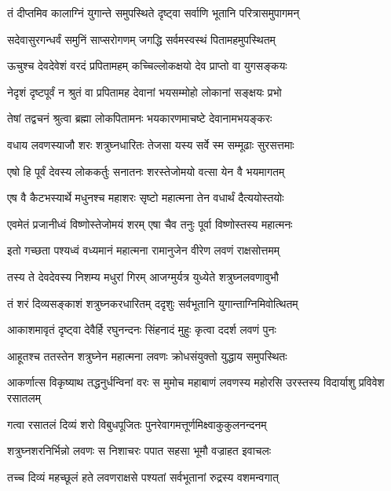 \twolineshloka
{तं दीप्तमिव कालाग्निं युगान्ते समुपस्थिते}
{दृष्ट्वा सर्वाणि भूतानि परित्रासमुपागमन्} %

\twolineshloka
{सदेवासुरगन्धर्वं समुनिं साप्सरोगणम्}
{जगद्धि सर्वमस्वस्थं पितामहमुपस्थितम्} %

\twolineshloka
{ऊचुश्च देवदेवेशं वरदं प्रपितामहम्}
{कच्चिल्लोकक्षयो देव प्राप्तो वा युगसङ्कयः} %

\twolineshloka
{नेदृशं दृष्टपूर्वं न श्रुतं वा प्रपितामह}
{देवानां भयसम्मोहो लोकानां सङ्क्षयः प्रभो} %

\twolineshloka
{तेषां तद्वचनं श्रुत्वा ब्रह्मा लोकपितामनः}
{भयकारणमाचष्टे देवानामभयङ्करः} %

\twolineshloka
{वधाय लवणस्याजौ शरः शत्रुघ्नधारितः}
{तेजसा यस्य सर्वे स्म सम्मूढाः सुरसत्तमाः} %

\twolineshloka
{एषो हि पूर्वं देवस्य लोककर्तुः सनातनः}
{शरस्तेजोमयो वत्सा येन वै भयमागतम्} %

\twolineshloka
{एष वै कैटभस्यार्थे मधुनश्च महाशरः}
{सृष्टो महात्मना तेन वधार्थं दैत्ययोस्तयोः} %

\twolineshloka
{एवमेतं प्रजानीध्वं विष्णोस्तेजोमयं शरम्}
{एषा चैव तनुः पूर्वा विष्णोस्तस्य महात्मनः} %

\twolineshloka
{इतो गच्छता पश्यध्वं वध्यमानं महात्मना}
{रामानुजेन वीरेण लवणं राक्षसोत्तमम्} %

\twolineshloka
{तस्य ते देवदेवस्य निशम्य मधुरां गिरम्}
{आजग्मुर्यत्र युध्येते शत्रुघ्नलवणावुभौ} %

\twolineshloka
{तं शरं दिव्यसङ्काशं शत्रुघ्नकरधारितम्}
{ददृशुः सर्वभूतानि युगान्ताग्निमिवोत्थितम्} %

\twolineshloka
{आकाशमावृतं दृष्ट्वा देवैर्हि रघुनन्दनः}
{सिंहनादं मुहुः कृत्वा ददर्श लवणं पुनः} %

\twolineshloka
{आहूतश्च ततस्तेन शत्रुघ्नेन महात्मना}
{लवणः क्रोधसंयुक्तो युद्धाय समुपस्थितः} %

\threelineshloka
{आकर्णात्स विकृष्याथ तद्धनुर्धन्विनां वरः}
{स मुमोच महाबाणं लवणस्य महोरसि}
{उरस्तस्य विदार्याशु प्रविवेश रसातलम्} %

\twolineshloka
{गत्वा रसातलं दिव्यं शरो विबुधपूजितः}
{पुनरेवागमत्तूर्णमिक्ष्वाकुकुलनन्दनम्} %

\twolineshloka
{शत्रुघ्नशरनिर्भिन्नो लवणः स निशाचरः}
{पपात सहसा भूमौ वज्राहत इवाचलः} %

\twolineshloka
{तच्च दिव्यं महच्छूलं हते लवणराक्षसे}
{पश्यतां सर्वभूतानां रुद्रस्य वशमन्वगात्} %

